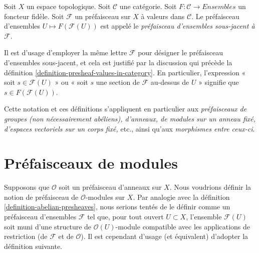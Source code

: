 \begin{definition}
\label{definition-underlying-presheaf-sets}
Soit $X$ un espace topologique. Soit $\mathcal{C}$ une catégorie.
Soit $F : \mathcal{C} \to \textit{Ensembles}$ un foncteur fidèle.
Soit $\mathcal{F}$ un préfaisceau sur $X$ à valeurs dans $\mathcal{C}$.
Le préfaisceau d'ensembles $U \mapsto F(\mathcal{F}(U))$
est appelé le {\it préfaisceau d'ensembles sous-jacent à $\mathcal{F}$}.
\end{definition}

\noindent
Il est d'usage d'employer la même lettre $\mathcal{F}$ pour désigner
le préfaisceau d'ensembles sous-jacent, et cela est
justifié par la discussion qui précède la
définition \ref{definition-presheaf-values-in-category}.
En particulier, l'expression « soit $s \in \mathcal{F}(U)$ »
ou « soit $s$ une section de $\mathcal{F}$ au-dessus de $U$ » signifie
que $s \in F(\mathcal{F}(U))$.

\medskip\noindent
Cette notation et ces définitions s'appliquent en particulier aux
{\it préfaisceaux de groupes (non nécessairement abéliens), d'anneaux, de modules
sur un anneau fixé, d'espaces vectoriels sur un corps fixé, } etc., ainsi qu'aux
{\it morphismes entre ceux-ci}.

\section{Préfaisceaux de modules}
\label{section-presheaves-modules}

\noindent
Supposons que $\mathcal{O}$ soit un préfaisceau d'anneaux sur $X$.
Nous voudrions définir la notion de préfaisceau de
$\mathcal{O}$-modules sur $X$. Par analogie avec la définition
\ref{definition-abelian-presheaves}, nous serions tentés de le définir
comme un préfaisceau d'ensembles $\mathcal{F}$ tel que, pour tout ouvert
$U \subset X$, l'ensemble $\mathcal{F}(U)$ soit muni d'une structure
de $\mathcal{O}(U)$-module compatible avec les applications de restriction
(de $\mathcal{F}$ et de $\mathcal{O}$). Il est cependant d'usage
(et équivalent) d'adopter la définition suivante.

